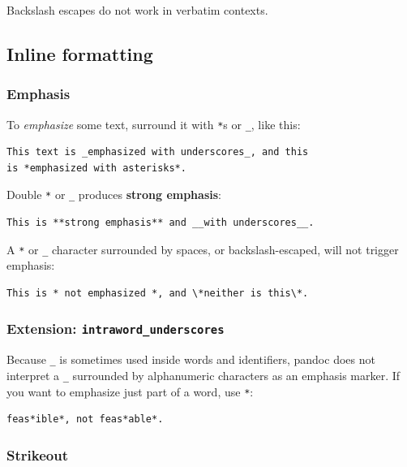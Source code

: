 \documentclass[
]{article}
\begin{document}
Backslash escapes do not work in verbatim contexts.

\hypertarget{inline-formatting}{%
\subsection{Inline formatting}\label{inline-formatting}}

\hypertarget{emphasis}{%
\subsubsection{Emphasis}\label{emphasis}}

To \emph{emphasize} some text, surround it with \texttt{*}s or
\texttt{\_}, like this:

\begin{verbatim}
This text is _emphasized with underscores_, and this
is *emphasized with asterisks*.
\end{verbatim}

Double \texttt{*} or \texttt{\_} produces \textbf{strong emphasis}:

\begin{verbatim}
This is **strong emphasis** and __with underscores__.
\end{verbatim}

A \texttt{*} or \texttt{\_} character surrounded by spaces, or
backslash-escaped, will not trigger emphasis:

\begin{verbatim}
This is * not emphasized *, and \*neither is this\*.
\end{verbatim}

\hypertarget{extension-intraword_underscores}{%
\subsubsection{\texorpdfstring{Extension:
\texttt{intraword\_underscores}}{Extension: intraword\_underscores}}\label{extension-intraword_underscores}}

Because \texttt{\_} is sometimes used inside words and identifiers,
pandoc does not interpret a \texttt{\_} surrounded by alphanumeric
characters as an emphasis marker. If you want to emphasize just part of
a word, use \texttt{*}:

\begin{verbatim}
feas*ible*, not feas*able*.
\end{verbatim}

\hypertarget{strikeout}{%
\subsubsection{Strikeout}\label{strikeout}}
\end{document}
